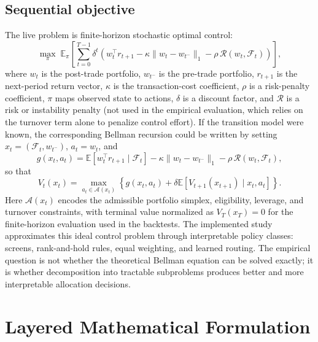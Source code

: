 \documentclass[journal,10pt]{IEEEtran}
\newcommand{\E}{\mathbb{E}}
\begin{document}
\subsection{Sequential objective}
The live problem is finite-horizon stochastic optimal control:
\begin{equation}
\max_{\pi}\; \E_\pi\left[\sum_{t=0}^{T-1}\delta^t\left(w_t^\top r_{t+1}-\kappa\lVert w_t-w_{t^-}\rVert_1-\rho\,\mathcal{R}(w_t,\mathcal{F}_t)\right)\right],
\label{eq:sequential_objective}
\end{equation}
where $w_t$ is the post-trade portfolio, $w_{t^-}$ is the pre-trade portfolio, $r_{t+1}$ is the next-period return vector, $\kappa$ is the transaction-cost coefficient, $\rho$ is a risk-penalty coefficient, $\pi$ maps observed state to actions, $\delta$ is a discount factor, and $\mathcal{R}$ is a risk or instability penalty (not used in the empirical evaluation, which relies on the turnover term alone to penalize control effort). If the transition model were known, the corresponding Bellman recursion could be written by setting $x_t=(\mathcal{F}_t,w_{t^-})$, $a_t=w_t$, and
\begin{equation}
g(x_t,a_t)=\E\!\left[w_t^\top r_{t+1}\mid\mathcal{F}_t\right]-\kappa\lVert w_t-w_{t^-}\rVert_1-\rho\,\mathcal{R}(w_t,\mathcal{F}_t),
\end{equation}
so that
\begin{equation}
V_t(x_t)=\max_{a_t\in\mathcal{A}(x_t)}\left\{g(x_t,a_t)+\delta\E[V_{t+1}(x_{t+1})\mid x_t,a_t]\right\}.
\end{equation}
Here $\mathcal{A}(x_t)$ encodes the admissible portfolio simplex, eligibility, leverage, and turnover constraints, with terminal value normalized as $V_T(x_T)=0$ for the finite-horizon evaluation used in the backtests.
The implemented study approximates this ideal control problem through interpretable policy classes: screens, rank-and-hold rules, equal weighting, and learned routing. The empirical question is not whether the theoretical Bellman equation can be solved exactly; it is whether decomposition into tractable subproblems produces better and more interpretable allocation decisions.

\section{Layered Mathematical Formulation}
\end{document}
